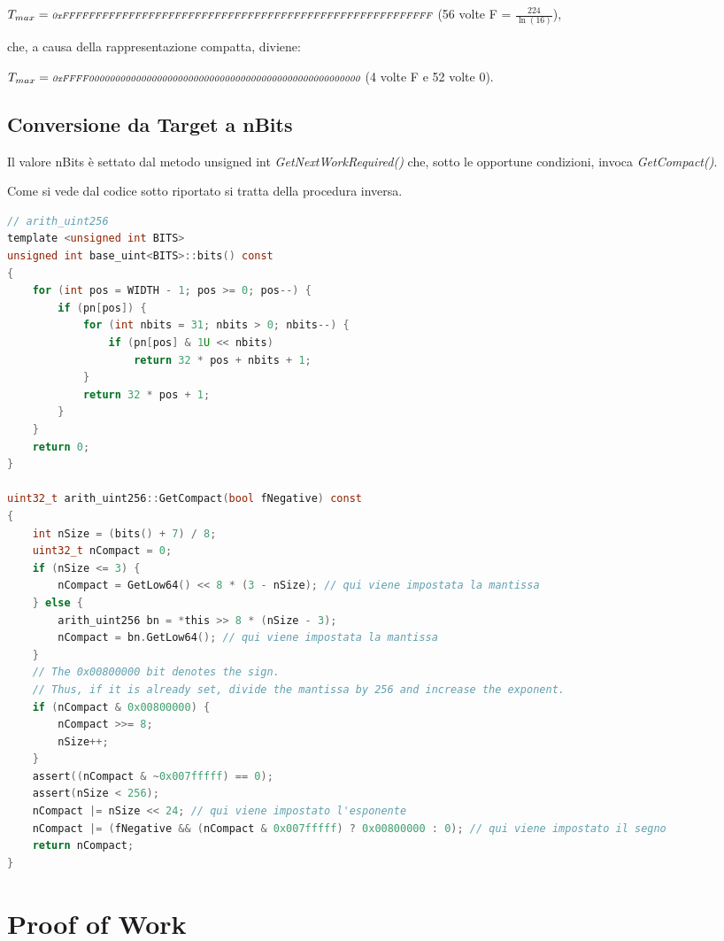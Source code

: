 \documentclass{article}
\begin{document}
$T_{max} = \textit{\scriptsize{0xFFFFFFFFFFFFFFFFFFFFFFFFFFFFFFFFFFFFFFFFFFFFFFFFFFFFFFFF}}$  (56 volte F = $\frac{224}{\ln(16)}$),

che, a causa della rappresentazione compatta, diviene:

$T_{max} = \textit{\scriptsize{0xFFFF0000000000000000000000000000000000000000000000000000}}$ (4 volte F e 52 volte 0).

\subsection{Conversione da Target a nBits}

Il valore nBits è settato dal metodo unsigned int \textit{GetNextWorkRequired()} che,
sotto le opportune condizioni, invoca \textit{GetCompact()}.

Come si vede dal codice sotto riportato si tratta della procedura inversa.

\lstset{style=mystyle}
\begin{lstlisting}[language=c]
// arith_uint256
template <unsigned int BITS>
unsigned int base_uint<BITS>::bits() const
{
    for (int pos = WIDTH - 1; pos >= 0; pos--) {
        if (pn[pos]) {
            for (int nbits = 31; nbits > 0; nbits--) {
                if (pn[pos] & 1U << nbits)
                    return 32 * pos + nbits + 1;
            }
            return 32 * pos + 1;
        }
    }
    return 0;
}

uint32_t arith_uint256::GetCompact(bool fNegative) const
{
    int nSize = (bits() + 7) / 8;
    uint32_t nCompact = 0;
    if (nSize <= 3) {
        nCompact = GetLow64() << 8 * (3 - nSize); // qui viene impostata la mantissa
    } else {
        arith_uint256 bn = *this >> 8 * (nSize - 3);
        nCompact = bn.GetLow64(); // qui viene impostata la mantissa
    }
    // The 0x00800000 bit denotes the sign.
    // Thus, if it is already set, divide the mantissa by 256 and increase the exponent.
    if (nCompact & 0x00800000) {
        nCompact >>= 8;
        nSize++;
    }
    assert((nCompact & ~0x007fffff) == 0);
    assert(nSize < 256);
    nCompact |= nSize << 24; // qui viene impostato l'esponente
    nCompact |= (fNegative && (nCompact & 0x007fffff) ? 0x00800000 : 0); // qui viene impostato il segno
    return nCompact;
}
\end{lstlisting}

\section{Proof of Work}
\end{document}
